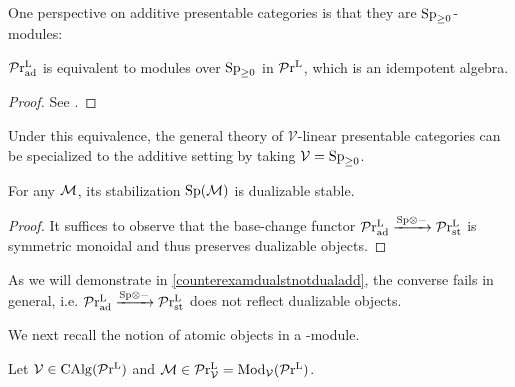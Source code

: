 \documentclass[a4paper,10pt, oneside]{amsart}
\begin{document}
	One perspective on additive presentable categories is that they are $\operatorname{Sp}_{\geq0}$-modules:
	\begin{lem}
		$\mathcal{P}\mathrm{r}_{\mathrm{ad}}^\mathrm{L}$ is equivalent to modules over $\operatorname{Sp}_{\geq0}$ in $\mathcal{P}\mathrm{r}^\mathrm{L}$, which is an idempotent algebra.
	\end{lem}
	\begin{proof}
		See \cite[Corollary 4.8]{ggn}.
	\end{proof}
Under this equivalence, the general theory of $\mathcal{V}$-linear presentable categories can be specialized to the additive setting by taking $\mathcal{V}=\operatorname{Sp}_{\geq0}$. 
\begin{prop}
	For any \dualaddinfcat $\mathcal{M}$, its stabilization $\mathrm{Sp}(\mathcal{M})$ is  dualizable stable.
\end{prop}
\begin{proof}
	It suffices to observe that the base-change functor $\mathcal{P}\mathrm{r}_{\mathrm{ad}}^\mathrm{L} \xrightarrow{\mathrm{Sp} \otimes -} \mathcal{P}\mathrm{r}_{\mathrm{st}}^\mathrm{L}$ is symmetric monoidal and thus preserves dualizable objects.
\end{proof}
\begin{rem}
	As we will demonstrate in \cref{counterexamdualstnotdualadd}, the converse fails in general, i.e. $\mathcal{P}\mathrm{r}_{\mathrm{ad}}^\mathrm{L} \xrightarrow{\mathrm{Sp} \otimes -} \mathcal{P}\mathrm{r}_{\mathrm{st}}^\mathrm{L}$ does not reflect dualizable objects.
\end{rem}

We next recall the notion of atomic objects in a \mcv-module.


	\begin{de}
		Let $\mathcal{V}\in \operatorname{CAlg}(\mathcal{P}\mathrm{r}^\mathrm{L})$ and $\mathcal{M}\in\mathcal{P}\mathrm{r}^\mathrm{L}_{\mathcal{V}}=\operatorname{Mod}_{\mathcal{V}}(\mathcal{P}\mathrm{r}^\mathrm{L})$. 
		
	\end{de}
	
\end{document}
